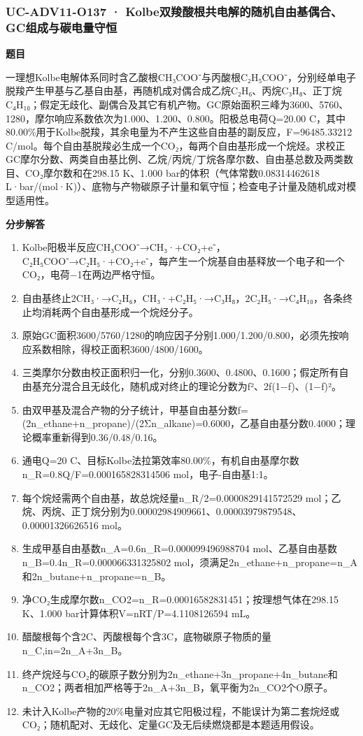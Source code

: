 \documentclass[UTF8,11pt,a4paper]{ctexart}
\begin{document}
\subsubsection*{UC-ADV11-O137 · Kolbe双羧酸根共电解的随机自由基偶合、GC组成与碳电量守恒}
\noindent\textbf{题目}\par
一理想Kolbe电解体系同时含乙酸根CH₃COO⁻与丙酸根C₂H₅COO⁻，分别经单电子脱羧产生甲基与乙基自由基，再随机成对偶合成乙烷C₂H₆、丙烷C₃H₈、正丁烷C₄H₁₀；假定无歧化、副偶合及其它有机产物。GC原始面积三峰为3600、5760、1280，摩尔响应系数依次为1.000、1.200、0.800。阳极总电荷Q=20.00 C，其中80.00\%用于Kolbe脱羧，其余电量为不产生这些自由基的副反应，F=96485.33212 C/mol。每个自由基脱羧必生成一个CO₂，每两个自由基形成一个烷烃。求校正GC摩尔分数、两类自由基比例、乙烷/丙烷/丁烷各摩尔数、自由基总数及两类数目、CO₂摩尔数和在298.15 K、1.000 bar的体积（气体常数0.08314462618 L·bar/(mol·K)）、底物与产物碳原子计量和氧守恒；检查电子计量及随机成对模型适用性。\par
\medskip\noindent\textbf{分步解答}
\begin{enumerate}
\item Kolbe阳极半反应CH₃COO⁻→CH₃·+CO₂+e⁻，C₂H₅COO⁻→C₂H₅·+CO₂+e⁻，每产生一个烷基自由基释放一个电子和一个CO₂，电荷−1在两边严格守恒。
\item 自由基终止2CH₃·→C₂H₆，CH₃·+C₂H₅·→C₃H₈，2C₂H₅·→C₄H₁₀，各条终止均消耗两个自由基形成一个烷烃分子。
\item 原始GC面积3600/5760/1280的响应因子分别1.000/1.200/0.800，必须先按响应系数相除，得校正面积3600/4800/1600。
\item 三类摩尔分数由校正面积归一化，分别0.3600、0.4800、0.1600；假定所有自由基充分混合且无歧化，随机成对终止的理论分数为f²、2f(1−f)、(1−f)²。
\item 由双甲基及混合产物的分子统计，甲基自由基分数f=(2n\_ethane+n\_propane)/(2Σn\_alkane)=0.6000，乙基自由基分数0.4000；理论概率重新得到0.36/0.48/0.16。
\item 通电Q=20 C、目标Kolbe法拉第效率80.00\%，有机自由基摩尔数n\_R=0.8Q/F=0.000165828314506 mol，电子-自由基1:1。
\item 每个烷烃需两个自由基，故总烷烃量n\_R/2=0.0000829141572529 mol；乙烷、丙烷、正丁烷分别为0.00002984909661、0.00003979879548、0.00001326626516 mol。
\item 生成甲基自由基数n\_A=0.6n\_R=0.000099496988704 mol、乙基自由基数n\_B=0.4n\_R=0.000066331325802 mol，须满足2n\_ethane+n\_propane=n\_A和2n\_butane+n\_propane=n\_B。
\item 净CO₂生成摩尔数n\_CO2=n\_R=0.00016582831451；按理想气体在298.15 K、1.000 bar计算体积V=nRT/P=4.1108126594 mL。
\item 醋酸根每个含2C、丙酸根每个含3C，底物碳原子物质的量n\_C,in=2n\_A+3n\_B。
\item 终产烷烃与CO₂的碳原子数分别为2n\_ethane+3n\_propane+4n\_butane和n\_CO2；两者相加严格等于2n\_A+3n\_B，氧平衡为2n\_CO2个O原子。
\item 未计入Kolbe产物的20\%电量对应其它阳极过程，不能误计为第二套烷烃或CO₂；随机配对、无歧化、定量GC及无后续燃烧都是本题适用假设。
\end{enumerate}
\end{document}
